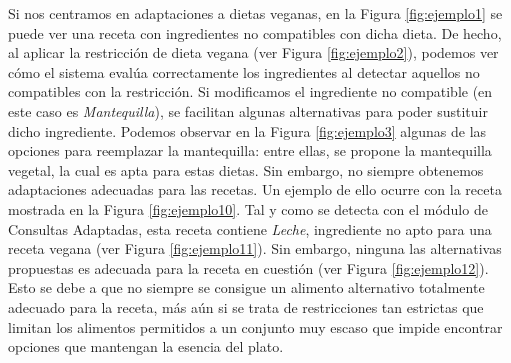 Si nos centramos en adaptaciones a dietas veganas, en la Figura \ref{fig:ejemplo1} se puede ver una receta con ingredientes no compatibles con dicha dieta. De hecho, al aplicar la restricción de dieta vegana (ver Figura \ref{fig:ejemplo2}), podemos ver cómo el sistema evalúa correctamente los ingredientes al detectar aquellos no compatibles con la restricción. Si modificamos el ingrediente no compatible (en este caso es \textit{Mantequilla}), se facilitan algunas alternativas para poder sustituir dicho ingrediente. Podemos observar en la Figura \ref{fig:ejemplo3} algunas de las opciones para reemplazar la mantequilla: entre ellas, se propone la mantequilla vegetal, la cual es apta para estas dietas. Sin embargo, no siempre obtenemos adaptaciones adecuadas para las recetas. Un ejemplo de ello ocurre con la receta mostrada en la Figura \ref{fig:ejemplo10}. Tal y como se detecta con el módulo de Consultas Adaptadas, esta receta contiene \textit{Leche}, ingrediente no apto para una receta vegana (ver Figura \ref{fig:ejemplo11}). Sin embargo, ninguna las alternativas propuestas es adecuada para la receta en cuestión (ver Figura \ref{fig:ejemplo12}). Esto se debe a que no siempre se consigue un alimento alternativo totalmente adecuado para la receta, más aún si se trata de restricciones tan estrictas que limitan los alimentos permitidos a un conjunto muy escaso que impide encontrar opciones que mantengan la esencia del plato.


